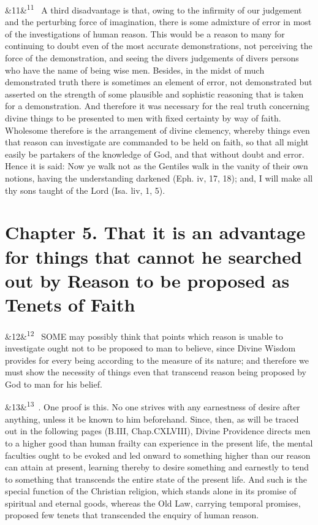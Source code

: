 \documentclass[12pt]{article}
\newcommand{\para}[1][]{\par\noindent\ifx&#1&\else\textsuperscript{\footnotesize #1}~\fi}
\begin{document}
\para[11] A third disadvantage is that, owing to the infirmity of our judgement and the perturbing force of imagination, there is some admixture of error in most of the investigations of human reason. This would be a reason to many for continuing to doubt even of the most accurate demonstrations, not perceiving the force of the demonstration, and seeing the divers judgements of divers persons who have the name of being wise men. Besides, in the midst of much demonstrated truth there is sometimes an element of error, not demonstrated but asserted on the strength of some plausible and sophistic reasoning that is taken for a demonstration. And therefore it was necessary for the real truth concerning divine things to be presented to men with fixed certainty by way of faith. Wholesome therefore is the arrangement of divine clemency, whereby things even that reason can investigate are commanded to be held on faith, so that all might easily be partakers of the knowledge of God, and that without doubt and error. Hence it is said: Now ye walk not as the Gentiles walk in the vanity of their own notions, having the understanding darkened (Eph. iv, 17, 18); and, I will make all thy sons taught of the Lord (Isa. liv, 1, 5).

\section*{Chapter 5. That it is an advantage for things that cannot he searched out by Reason to be proposed as Tenets of Faith}

\para[12] SOME may possibly think that points which reason is unable to investigate ought not to be proposed to man to believe, since Divine Wisdom provides for every being according to the measure of its nature; and therefore we must show the necessity of things even that transcend reason being proposed by God to man for his belief.

\para[13] 1. One proof is this. No one strives with any earnestness of desire after anything, unless it be known to him beforehand. Since, then, as will be traced out in the following pages (B.III, Chap.CXLVIII), Divine Providence directs men to a higher good than human frailty can experience in the present life, the mental faculties ought to be evoked and led onward to something higher than our reason can attain at present, learning thereby to desire something and earnestly to tend to something that transcends the entire state of the present life. And such is the special function of the Christian religion, which stands alone in its promise of spiritual and eternal goods, whereas the Old Law, carrying temporal promises, proposed few tenets that transcended the enquiry of human reason.
\end{document}
